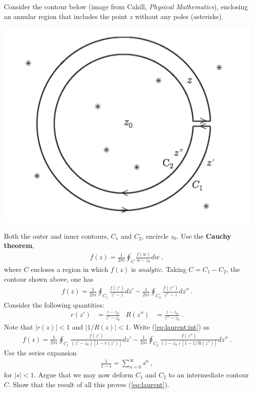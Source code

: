 \documentclass[12pt]{article}
\numberwithin{equation}{subsection}    %
\begin{document}
Consider the contour below (image from Cahill, \emph{Physical Mathematics}), enclosing an annular region that includes the point $z$ without any poles (asterisks).
\begin{center}
\includegraphics[width=.5\textwidth]{P231_2018_HW3a_fig3}
\end{center}
Both the outer and inner contours, $C_1$ and $C_2$, encircle $z_0$. Use the \textbf{Cauchy theorem},
\begin{align}
	f(z) = \frac{1}{2\pi i} \oint_{C} \frac{f(w)}{w-z_0} dw \ ,
	\label{eq:laurent}
\end{align}
where $C$ encloses a region in which $f(z)$ is \emph{analytic}. Taking $C = C_1 - C_2$, the contour shown above, one has
\begin{align}
	f(z) = 
	\frac{1}{2\pi i} \oint_{C_1} \frac{f(z')}{z'-z} dz'
	-
	\frac{1}{2\pi i} \oint_{C_2} \frac{f(z'')}{z''-z} dz'' \ .
	\label{eq:laurent:int}
\end{align}
Consider the following quantities:
\begin{align}
	r(z') &= \frac{z-z_0}{z'-z_0}
	&
	R(z'') &= \frac{z - z_0}{z''-z_0} \ .
\end{align}
Note that $|r(z)| < 1$ and $|1/R(z)| < 1$. Write (\ref{eq:laurent:int}) as
\begin{align}
	f(z) = 
	\frac{1}{2\pi i} \oint_{C_1} \frac{f(z')}{(z'-z_0)\left[1-r(z')\right]} dz'
	-
	\frac{1}{2\pi i} \oint_{C_2} \frac{f(z'')}{(z-z_0)\left[1-1/R(z'')\right]} dz'' \ .
\end{align}
Use the series expansion
\begin{align}
	\frac{1}{1-s} = \sum_{n=0}^\infty s^n \ ,
\end{align}
for $|s|<1$. Argue that we may now deform $C_1$ and $C_2$ to an intermediate contour $C$. Show that the result of all this proves (\ref{eq:laurent}).
\end{document}

